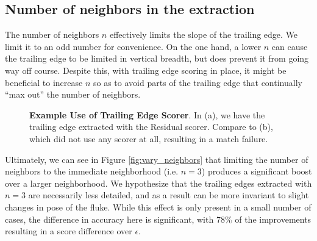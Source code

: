\subsection{Number of neighbors in the extraction}

The number of neighbors $n$ effectively limits the slope of the trailing edge.
We limit it to an odd number for convenience.
On the one hand, a lower $n$ can cause the trailing edge to be limited in vertical breadth, but does prevent it from going way off course.
Despite this, with trailing edge scoring in place, it might be beneficial to increase $n$ so as to avoid parts of the trailing edge that continually ``max out'' the number of neighbors.

\begin{figure}[t]%
\centering
{}
\newline
{}
\caption{\textbf{Example Use of Trailing Edge Scorer}. In (a), we have the trailing edge extracted with the Residual scorer. Compare to (b), which did not use any scorer at all, resulting in a match failure.}
\label{fig:dis_te_use}
\end{figure}

Ultimately, we can see in Figure \ref{fig:vary_neighbors} that limiting the number of neighbors to the immediate neighborhood (i.e. $n = 3$) produces a significant boost over a larger neighborhood.
We hypothesize that the trailing edges extracted with $n = 3$ are necessarily less detailed, and as a result can be more invariant to slight changes in pose of the fluke.
While this effect is only present in a small number of cases, the difference in accuracy here is significant, with 78\% of the improvements resulting in a score difference over $\epsilon$.

